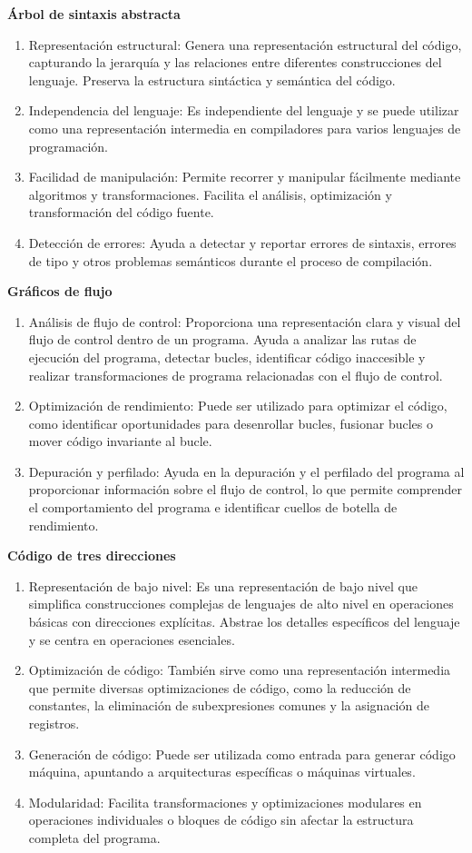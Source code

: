 \textbf{Árbol de sintaxis abstracta}
\begin{enumerate}
    \item Representación estructural: Genera una representación estructural del código, capturando la jerarquía y las relaciones entre diferentes construcciones del lenguaje.
    Preserva la estructura sintáctica y semántica del código.
    \item Independencia del lenguaje: Es independiente del lenguaje y se puede utilizar como una representación intermedia en compiladores para varios lenguajes de programación.
    \item Facilidad de manipulación: Permite recorrer y manipular fácilmente mediante algoritmos y transformaciones.
    Facilita el análisis, optimización y transformación del código fuente.
    \item Detección de errores: Ayuda a detectar y reportar errores de sintaxis, errores de tipo y otros problemas semánticos durante el proceso de compilación.
\end{enumerate}

\textbf{Gráficos de flujo}
\begin{enumerate}
    \item Análisis de flujo de control: Proporciona una representación clara y visual del flujo de control dentro de un programa.
    Ayuda a analizar las rutas de ejecución del programa, detectar bucles, identificar código inaccesible y realizar transformaciones de programa relacionadas con el flujo de control.
    \item Optimización de rendimiento: Puede ser utilizado para optimizar el código, como identificar oportunidades para desenrollar bucles, fusionar bucles o mover código invariante al bucle.
    \item Depuración y perfilado: Ayuda en la depuración y el perfilado del programa al proporcionar información sobre el flujo de control, lo que permite comprender el comportamiento del programa e identificar cuellos de botella de rendimiento.
\end{enumerate}

\textbf{Código de tres direcciones}
\begin{enumerate}
    \item Representación de bajo nivel: Es una representación de bajo nivel que simplifica construcciones complejas de lenguajes de alto nivel en operaciones básicas con direcciones explícitas.
    Abstrae los detalles específicos del lenguaje y se centra en operaciones esenciales.
    \item Optimización de código: También sirve como una representación intermedia que permite diversas optimizaciones de código, como la reducción de constantes, la eliminación de subexpresiones comunes y la asignación de registros.
    \item Generación de código: Puede ser utilizada como entrada para generar código máquina, apuntando a arquitecturas específicas o máquinas virtuales.
    \item Modularidad: Facilita transformaciones y optimizaciones modulares en operaciones individuales o bloques de código sin afectar la estructura completa del programa.
\end{enumerate}